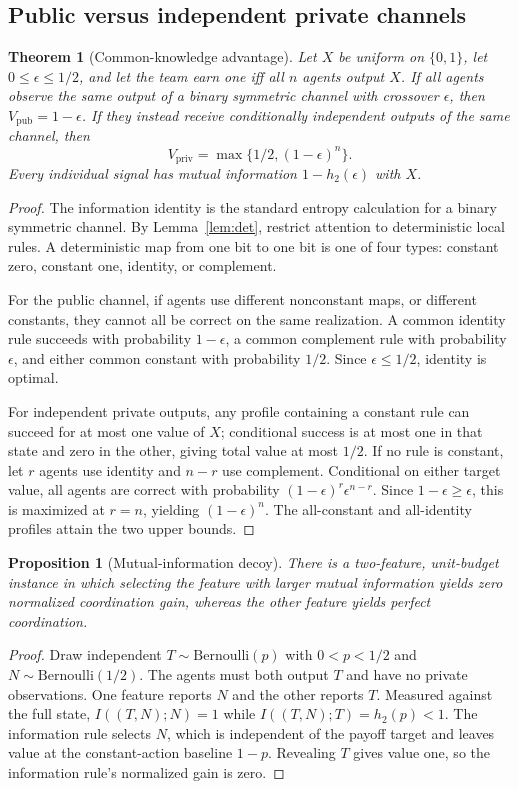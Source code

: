 \documentclass[11pt]{article}
\newtheorem{theorem}{Theorem}
\newtheorem{proposition}{Proposition}
\begin{document}
\subsection{Public versus independent private channels}
\begin{theorem}[Common-knowledge advantage]\label{thm:public-private-supp}
Let $X$ be uniform on $\{0,1\}$, let $0\le\epsilon\le1/2$, and let the team earn one iff all $n$ agents output $X$. If all agents observe the same output of a binary symmetric channel with crossover $\epsilon$, then $V_{\mathrm{pub}}=1-\epsilon$. If they instead receive conditionally independent outputs of the same channel, then
\[
V_{\mathrm{priv}}=\max\{1/2,(1-\epsilon)^n\}.
\]
Every individual signal has mutual information $1-h_2(\epsilon)$ with $X$.
\end{theorem}
\begin{proof}
The information identity is the standard entropy calculation for a binary symmetric channel. By Lemma~\ref{lem:det}, restrict attention to deterministic local rules. A deterministic map from one bit to one bit is one of four types: constant zero, constant one, identity, or complement.

For the public channel, if agents use different nonconstant maps, or different constants, they cannot all be correct on the same realization. A common identity rule succeeds with probability $1-\epsilon$, a common complement rule with probability $\epsilon$, and either common constant with probability $1/2$. Since $\epsilon\le1/2$, identity is optimal.

For independent private outputs, any profile containing a constant rule can succeed for at most one value of $X$; conditional success is at most one in that state and zero in the other, giving total value at most $1/2$. If no rule is constant, let $r$ agents use identity and $n-r$ use complement. Conditional on either target value, all agents are correct with probability $(1-\epsilon)^r\epsilon^{n-r}$. Since $1-\epsilon\ge\epsilon$, this is maximized at $r=n$, yielding $(1-\epsilon)^n$. The all-constant and all-identity profiles attain the two upper bounds.
\end{proof}

\begin{proposition}[Mutual-information decoy]\label{prop:decoy-supp}
There is a two-feature, unit-budget instance in which selecting the feature with larger mutual information yields zero normalized coordination gain, whereas the other feature yields perfect coordination.
\end{proposition}
\begin{proof}
Draw independent $T\sim\mathrm{Bernoulli}(p)$ with $0<p<1/2$ and $N\sim\mathrm{Bernoulli}(1/2)$. The agents must both output $T$ and have no private observations. One feature reports $N$ and the other reports $T$. Measured against the full state, $I((T,N);N)=1$ while $I((T,N);T)=h_2(p)<1$. The information rule selects $N$, which is independent of the payoff target and leaves value at the constant-action baseline $1-p$. Revealing $T$ gives value one, so the information rule's normalized gain is zero.
\end{proof}
\end{document}
